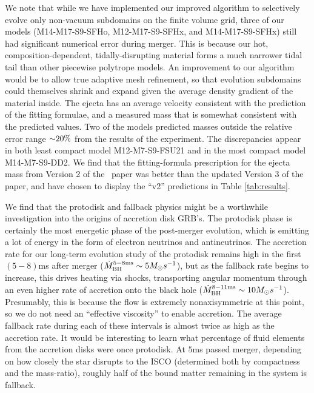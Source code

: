 We note that while we have implemented our improved algorithm to selectively evolve only non-vacuum subdomains on the finite volume grid, three of our models (M14-M17-S9-SFHo, M12-M17-S9-SFHx, and M14-M17-S9-SFHx) still had significant numerical error during merger. 
This is because our hot, composition-dependent, tidally-disrupting material forms a much narrower tidal tail than other piecewise polytrope models.
An improvement to our algorithm would be to allow true adaptive mesh refinement, so that evolution subdomains could themselves shrink and expand given the average density gradient of the material inside.
The ejecta has an average velocity consistent with the prediction of the fitting formulae, and a measured mass that is somewhat consistent with the predicted values.
Two of the models predicted masses outside the relative error range $\mathord{\sim}20\%$ from the results of the experiment.
The discrepancies appear in both least compact model M12-M7-S9-FSU21 and in the most compact model M14-M7-S9-DD2.
We find that the fitting-formula prescription for the ejecta mass from Version 2 of the~\cite{Kyutoku:2015} paper was better than the updated Version 3 of the paper, and have chosen to display the ``v2'' predictions in Table \ref{tab:results}.

We find that the protodisk and fallback physics might be a worthwhile investigation into the origins of accretion disk GRB's.
The protodisk phase is certainly the most energetic phase of the post-merger evolution, which is emitting a lot of energy in the form of electron neutrinos and antineutrinos. 
The accretion rate for our long-term evolution study of the protodisk remains high in the first $(5-8)$ms after merger ($\dot{M}^{5-8 {\rm ms}}_{\rm BH} \sim 5 M_\odot s^{-1}$), but as the fallback rate begins to increase, this drives heating via shocks, transporting angular momentum through an even higher rate of accretion onto the black hole ($\dot{M}^{8-11 {\rm ms}}_{\rm BH} \sim 10 M_\odot s^{-1}$).
Presumably, this is because the flow is extremely nonaxisymmetric at this point, so we do not need an ``effective viscosity'' to enable accretion.
The average fallback rate during each of these intervals is almost twice as high as the accretion rate.
It would be interesting to learn what percentage of fluid elements from the accretion disks were once protodisk.
At $5$ms passed merger, depending on how closely the star disrupts to the ISCO (determined both by compactness and the mass-ratio), roughly half of the bound matter remaining in the system is fallback.

